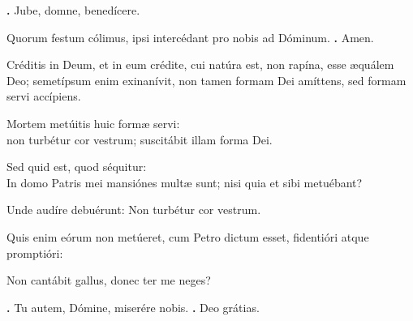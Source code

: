 \begin{small}
\textbf{\Vbar.} Jube, domne, benedícere.

Quorum festum cólimus, ipsi intercédant pro nobis ad Dóminum.
\textbf{\Rbar.} Amen.
\end{small}


Créditis in Deum, et in eum crédite, cui natúra est, non rapína, esse æquálem Deo; semetípsum enim exinanívit, non tamen formam Dei amíttens, sed formam servi accípiens. 

Mortem metúitis huic formæ servi: \\
non turbétur cor vestrum; suscitábit illam forma Dei. 

Sed quid est, quod séquitur: \\
In domo Patris mei mansiónes multæ sunt; nisi quia et sibi metuébant? 

Unde audíre debuérunt: Non turbétur cor vestrum. 

Quis enim eórum non metúeret, cum Petro dictum esset, fidentióri atque promptióri: 

Non cantábit gallus, donec ter me neges?

\textbf{\Vbar.} Tu autem, Dómine, miserére nobis.
\textbf{\Rbar.} Deo grátias.

